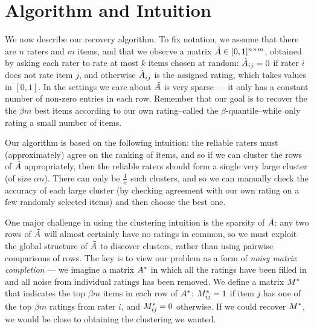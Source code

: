 \section{Algorithm and Intuition}
\label{sec:algorithm}



We now describe our recovery algorithm. To fix notation, we assume that 
there are $n$ raters and $m$ items, and that we observe a matrix 
$\tilde{A} \in [0,1]^{n \times m}$, obtained by asking each rater to rate at most $k$ 
items chosen at random: $\tilde{A}_{ij} = 0$ if rater $i$ does not rate item 
$j$, and otherwise $\tilde{A}_{ij}$ is the assigned rating, which takes values 
in $[0,1]$. In the settings we 
care about $\tilde{A}$ is very sparse --- it only has a constant number of 
non-zero entries in each row. Remember that our goal is to recover the 
the $\beta m$ best items according to our own rating--called the $\beta$-quantile--while only rating a 
small number of items.

Our algorithm is based on the following intuition: the reliable raters must 
(approximately) agree on the ranking of items, and so if we can cluster the 
rows of $\tilde{A}$ appropriately, then the reliable raters should form a single very large cluster 
(of size $\alpha n$). There can only be $\frac{1}{\alpha}$ such clusters, and 
so we can manually check the accuracy of each large cluster (by checking agreement 
with our own rating on a few randomly selected items) and 
then choose the best one.

One major challenge in using the clustering intuition is the sparsity of 
$\tilde{A}$: any two rows of $\tilde{A}$ will almost certainly have no ratings in common, 
so we must exploit the global structure of $\tilde{A}$ to discover 
clusters, rather than using pairwise comparisons of rows.
The key is to view our problem as a form of \emph{noisy matrix completion} --- 
we imagine a matrix $A^*$ in which all the ratings have been filled in 
and all noise from individual ratings has been removed. We define a 
matrix $M^*$ that indicates the top $\beta m$ items in each row of $A^*$: 
$M^*_{ij} = 1$ if item $j$ has one of the top $\beta m$ ratings from rater $i$, 
and $M^*_{ij} = 0$ otherwise. If we could recover $M^*$, we would be 
close to obtaining the clustering we wanted.

